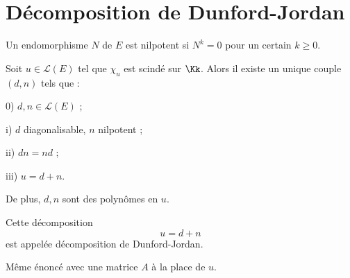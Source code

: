 \documentclass[class=report,crop=false]{standalone}
\begin{document}
\section{Décomposition de Dunford-Jordan}
Un endomorphisme $N$ de $E$ est nilpotent si $N^k=0$ pour un certain $k \ge 0$.
\begin{theoreme}
Soit $u \in \mathcal{L}(E)$ tel que $\chi_u$ est scindé sur $\Kk$. Alors il existe un unique couple $(d,n)$ tels que :

0) $d,n \in \mathcal{L}(E)$ ;

i) $d$ diagonalisable, $n$ nilpotent ;

ii) $dn=nd$ ;

iii) $u=d+n$.

De plus, $d,n$ sont des polynômes en $u$.
\end{theoreme}

Cette décomposition \[u=d+n\]
est appelée décomposition de Dunford-Jordan.

\begin{remarque*}
Même énoncé avec une matrice $A$ à la place de $u$.
\end{remarque*}
\end{document}

